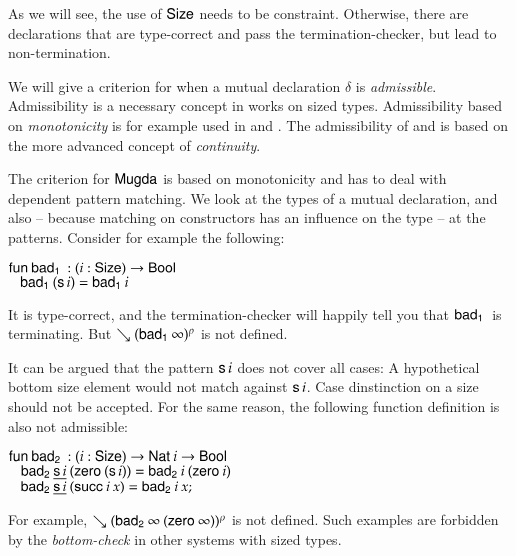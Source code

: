 As we will see, the use of $\mathsf{Size}$ needs to be constraint.
Otherwise, there are declarations that are type-correct and pass the termination-checker, but lead to non-termination.

We will give a criterion for when a mutual declaration $\delta$ is \emph{admissible}.
Admissibility is a necessary concept in works on sized types.
Admissibility based on \emph{monotonicity} is for example used in \cite{bgp:lpar06} and \cite{blanqui04typebased}.
The admissibility of \cite{abel:PhD} and \cite{hughes96proving} is based on the more advanced concept of \emph{continuity}.

The criterion for $\textsf{Mugda}$ is based on monotonicity and has to deal with dependent pattern matching. 
We look at the types of a mutual declaration, and also -- because matching on constructors has an influence on the type -- at the patterns. Consider for example the following:
\begin{bsp}
$\mathsf{fun}\: \mathsf{bad_1}\: : ( i : \mathsf{Size} ) \rightarrow{\mathsf{Bool}}$\\
$\hspace*{3mm} \mathsf{bad_1}\: (\mathsf{s}\, i) = \mathsf{bad_1}\: i $ 
\end{bsp}
It is type-correct, and the termination-checker will happily tell you that $\mathsf{bad_1}\:$ is terminating.
But $\searrow (\mathsf{bad_1}\: \infty)^{\rho}$ is not defined.

It can be argued that the pattern $\mathsf{s}\, i$ does not cover all cases: A hypothetical bottom size element would not match against $\mathsf{s}\, i$. Case dinstinction on a size should not be accepted.
For the same reason, the following function definition is also not admissible:
\begin{bsp}
$\mathsf{fun}\: \mathsf{bad_2}\: : ( i : \mathsf{Size} ) \rightarrow{\mathsf{Nat}\:i \rightarrow\mathsf{Bool}}$\\
$\hspace*{3mm} \mathsf{bad_2}\: \underline{\mathsf{s}\, i} \: (\mathsf{zero}\: (\mathsf{s}\, i)) = \mathsf{bad_2}\: i \: (\mathsf{zero}\: i)$\\
$\hspace*{3mm} \mathsf{bad_2}\: \underline{\mathsf{s}\, i}\: (\mathsf{succ}\: i \: x) = \mathsf{bad_2}\: i \: x;$
\end{bsp}
For example, $\searrow (\mathsf{bad_2}\: \infty \: (\mathsf{zero}\: \infty))^{\rho}$ is not defined.
Such examples are forbidden by the \emph{bottom-check} \cite{hughes96proving} in other systems with sized types.

